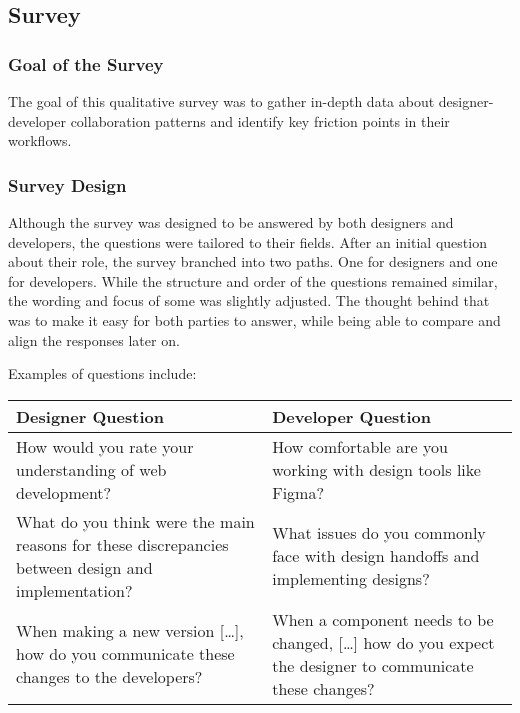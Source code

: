 \newpage
\subsection{Survey}

\subsubsection{Goal of the Survey}
The goal of this qualitative survey was to gather in-depth data about designer-developer
collaboration patterns and identify key friction points in their workflows.

\subsubsection{Survey Design}
Although the survey was designed to be answered by both designers and developers, the questions were
tailored to their fields. After an initial question about their role, the survey branched into two
paths. One for designers and one for developers. While the structure and order of the questions
remained similar, the wording and focus of some was slightly adjusted. The thought behind that was
to make it easy for both parties to answer, while being able to compare and align the responses
later on.

Examples of questions include: %
\begin{center}
    \begin{tabular}{|m{7.5cm}|m{7.5cm}|}
        \hline
        \textbf{Designer Question}                                                                         & \textbf{Developer Question}                                                                                \\
        \hline
        How would you rate your understanding of web development?                                          & How comfortable are you working with design tools like Figma?                                              \\
        \hline
        What do you think were the main reasons for these discrepancies between design and implementation? & What issues do you commonly face with design handoffs and implementing designs?                            \\
        \hline
        When making a new version [\dots], how do you communicate these changes to the developers?         & When a component needs to be changed, [\dots] how do you expect the designer to communicate these changes? \\
        \hline
    \end{tabular}
\end{center}

